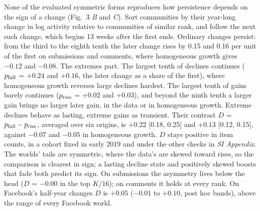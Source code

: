 \documentclass[9pt,twocolumn,twoside]{pnas-new}
\begin{document}
None of the evaluated symmetric forms reproduces how persistence depends on the sign of a change (Fig.~3 \textit{B} and \textit{C}). Sort communities by their year-long change in log activity relative to communities of similar rank, and follow the next such change, which begins 13 weeks after the first ends. Ordinary changes persist: from the third to the eighth tenth the later change rises by 0.15 and 0.16 per unit of the first on submissions and comments, where homogeneous growth gives $-0.12$ and $-0.08$. The extremes part. The largest tenth of declines continues ($p_{\rm fall}$ = $+0.24$ and $+0.16$, the later change as a share of the first), where homogeneous growth reverses large declines hardest. The largest tenth of gains barely continues ($p_{\rm rise}$ = $+0.02$ and $+0.03$), and beyond the ninth tenth a larger gain brings no larger later gain, in the data or in homogeneous growth. Extreme declines behave as lasting, extreme gains as transient. Their contrast $D$ = $p_{\rm fall} - p_{\rm rise}$, averaged over six origins, is $+0.22$ [0.18, 0.25] and $+0.13$ [0.12, 0.15], against $-0.07$ and $-0.05$ in homogeneous growth. $D$ stays positive in item counts, in a cohort fixed in early 2019 and under the other checks in \textit{SI Appendix}. The worlds' tails are symmetric, where the data's are skewed toward rises, so the comparison is clearest in sign; a lasting decline state and positively skewed boosts that fade both predict its sign. On submissions the asymmetry lives below the head ($D$ = $-0.00$ in the top $K/16$); on comments it holds at every rank. On Facebook's half-year changes $D$ is $+0.05$ ($-0.01$ to $+0.10$, post hoc bands), above the range of every Facebook world.
\end{document}

